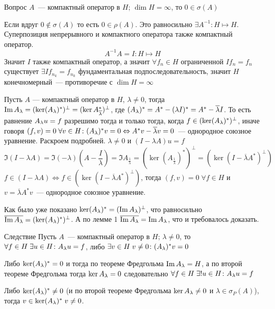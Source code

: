 \documentclass[14pt]{extarticle}
\begin{document}
\begin{MathCl}{Вопрос}
    $A$~--- компактный оператор в $H$; $\dim H = \infty$, то $0 \in \sigma(A)
    $
\end{MathCl}

\noindent Если вдруг $0 \notin \sigma(A)$ то есть $0 \in \rho(A)$.
Это равносильно $\exists A^{-1} : H \mapsto H$.
Суперпозиция непрерывного и компактного оператора также компактный оператор.
$$
A^{-1} A = I : H \mapsto H
$$
Значит $I$ также компактный оператор, а значит $\forall f_n \in H$ 
ограниченной $I f_n = f_n$ существует $\exists I f_{n_k} = f_{n_k}$ 
фундаментальная подпоследовательность, значит $H$ конечномерный~--- 
противоречие с $\dim H = \infty$
\begin{Theor}
    Пусть $A$ --- компактный оператор в $H$, $\lambda \ne 0$, тогда $\operatorname{Im} A_\lambda =
    (\ker (A_\lambda)^*)^\perp = (\ker A^*_{\overline{\lambda}})^\perp$,
    где $(A_\lambda)^* = A^* - (\lambda I)^* = A^* - \overline{\lambda} I$.
    То есть равнение $A_\lambda u = f$ разрешимо тогда и только тогда, когда
    $f \in (\ker(A_\lambda)^*)^\perp$, иначе говоря $(f, v) = 0\; \forall v \in H
    \colon (A_\lambda)^*v = 0 \Leftrightarrow A^*v - \overline{\lambda}v = 0$~--- 
    однородное союзное уравнение.
    Раскроем подробней.
    $\lambda \ne 0$ и $(I - \lambda A)u = f$
    $$
    \Im (I - \lambda A) = \Im (-\lambda)(A - \frac{I}{\lambda}) =
    \Im A_{\frac{1}{\lambda}} = (\ker(A_{\frac{1}{\lambda}})^*)^\perp = 
    (\ker(I - \overline{\lambda}A^*)^\perp)
    $$
    $f \in (I - \lambda A) \Leftrightarrow f \in (\ker(I - \overline{\lambda}
    A^*)^\perp)$, тогда $(f, v) = 0\; \forall f \in H$ и $v = 
    \overline{\lambda} A^*v$~--- однородное союзное уравнение.
\end{Theor}
\begin{Proof}
    Как было уже показано $\ker (A_\lambda)^* = (\operatorname{Im} A_\lambda)^\perp$, что равносильно
    $\overline{\operatorname{Im} A_\lambda} = (\ker (A_\lambda)^*)^\perp$.
    А по лемме 1 $\overline{\operatorname{Im} A_\lambda} = \operatorname{Im} A_\lambda$, что и требовалось доказать.
\end{Proof}
\begin{MathCl}{Следствие}
    Пусть $A$~--- компактный оператор в $H$; $\lambda \ne 0$, то $\forall f 
    \in H\;\exists u \in H\colon A_\lambda u = f$, либо $\exists v \in H\; v \ne 0
    \colon (A_\lambda)^* v = 0$
\end{MathCl}
\begin{Proof}
    Либо $\ker(A_\lambda)^* = 0$ и тогда по теореме Фредгольма $\operatorname{Im} A_\lambda = H$, а по
    второй теореме Фредгольма тогда $\ker A_\lambda = 0$ следовательно $\forall f 
    \in H\;\exists!u \in H \colon A_\lambda u = f$
    
    Либо $\ker(A_\lambda)^* \ne 0$ (и по второй теореме Фредгольма $\ker A_\lambda \ne 0$
    и $\lambda \in \sigma_P(A)$), тогда $v \in \ker (A_\lambda)^*\; v \ne 0$.
\end{Proof}
\end{document}
